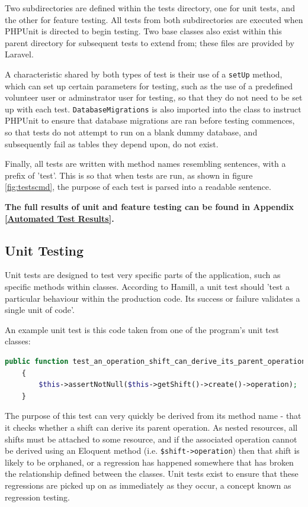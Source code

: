 Two subdirectories are defined within the tests directory, one for unit tests, and the other for feature testing. All tests from both subdirectories are executed when PHPUnit is directed to begin testing. Two base classes also exist within this parent directory for subsequent tests to extend from; these files are provided by Laravel. \cite{Laravel10}

A characteristic shared by both types of test is their use of a \texttt{setUp} method, which can set up certain parameters for testing, such as the use of a predefined volunteer user or adminstrator user for testing, so that they do not need to be set up with each test. \texttt{DatabaseMigrations} is also imported into the class to instruct PHPUnit to ensure that database migrations are ran before testing commences, so that tests do not attempt to run on a blank dummy database, and subsequently fail as tables they depend upon, do not exist. \cite{Laravel10}

Finally, all tests are written with method names resembling sentences, with a prefix of 'test'. This is so that when tests are run, as shown in figure \ref{fig:testscmd}, the purpose of each test is parsed into a readable sentence.

\textbf{The full results of unit and feature testing can be found in Appendix \ref{Automated Test Results}.}

\subsection{Unit Testing}
Unit tests are designed to test very specific parts of the application, such as specific methods within classes. According to Hamill, a unit test should 'test a particular behaviour within the production code. Its success or failure validates a single unit of code'. \cite{Hamill1}

An example unit test is this code taken from one of the program's unit test classes:

\begin{lstlisting}[language=PHP, breaklines]
    public function test_an_operation_shift_can_derive_its_parent_operation()
    {
        $this->assertNotNull($this->getShift()->create()->operation);
    }
\end{lstlisting}

The purpose of this test can very quickly be derived from its method name - that it checks whether a shift can derive its parent operation. As nested resources, all shifts must be attached to some resource, and if the associated operation cannot be derived using an Eloquent method (i.e. \texttt{\$shift->operation}) then that shift is likely to be orphaned, or a regression has happened somewhere that has broken the relationship defined between the classes. Unit tests exist to ensure that these regressions are picked up on as immediately as they occur, a concept known as regression testing. \cite{Hopping1}

